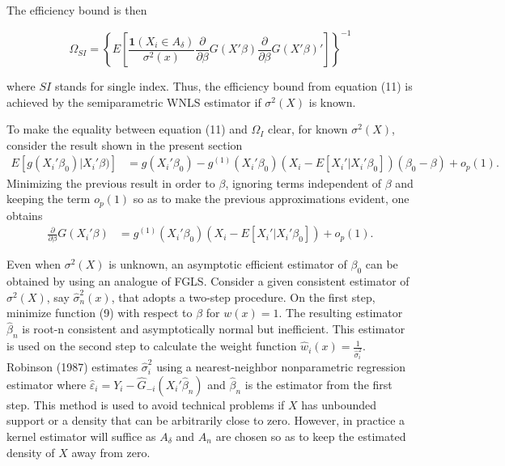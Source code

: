 \documentclass[a4paper]{article}
\begin{document}
The efficiency bound is then

\begin{equation}
\Omega_{SI} = \left\{ E\left[\frac{\mathbf{1}{(X_i \in A_\delta)}}{\sigma^2(x)}\frac{\partial}{\partial \beta}
 G(X'\beta)\frac{\partial}{\partial \beta} G(X'\beta)' \right] \right\}^{-1}
\end{equation}

where $SI$ stands for single index. Thus, the efficiency bound from equation (11) is achieved by the semiparametric WNLS estimator if $\sigma^2(X)$ is known.

To make the equality between equation (11) and $\Omega_I$ clear, for known $\sigma^2(X)$, consider the result shown in the present section
\begin{align*}
E[g(X_i'\beta_0)|X_i'\beta)] & = g(X_i'\beta_0) - g^{(1)}(X_i'\beta_0)( X_i - E[X_i'|X_i'\beta_0])(\beta_0 - \beta) + o_p(1).										   
\end{align*}
Minimizing the previous result in order to $\beta$, ignoring terms independent of $\beta$ and keeping the term $o_p(1)$ so as to make the previous approximations evident, one obtains
\begin{align*}
 \frac{\partial}{\partial \beta} G(X_i'\beta) & = g^{(1)}(X_i'\beta_0)( X_i - E[X_i'|X_i'\beta_0]) + o_p(1).
\end{align*}

Even when $\sigma^2(X)$ is unknown, an asymptotic efficient estimator of $\beta_0$ can be obtained by using an analogue of FGLS.  Consider a given consistent estimator of $\sigma^2(X)$, say $\hat{\sigma}_{n}^{2}(x)$, that adopts a two-step procedure. On the first step, minimize function (9) with respect to $\beta$ for $w(x) = 1$. The resulting estimator $\hat{\beta}_n$ is root-n consistent and asymptotically normal but inefficient. This estimator is used on the second step to calculate the weight function $\hat{w}_i(x) = \frac{1}{\hat{\sigma}_{i}^{2}}$. Robinson (1987) \cite{[20]} estimates $\hat{\sigma}_{i}^{2}$ using a nearest-neighbor nonparametric regression estimator
where $\hat{\varepsilon}_i = Y_i - \hat{G}_{-i}(X_i'\hat{\beta}_n)$ and $\hat{\beta}_n$ is the estimator from the first step. This method is used to avoid technical problems if $X$ has unbounded support or a density that can be arbitrarily close to zero. However, in practice a kernel estimator will suffice as $A_\delta$ and $A_n$ are chosen so as to keep the estimated density of $X$ away from zero.

\end{document}
